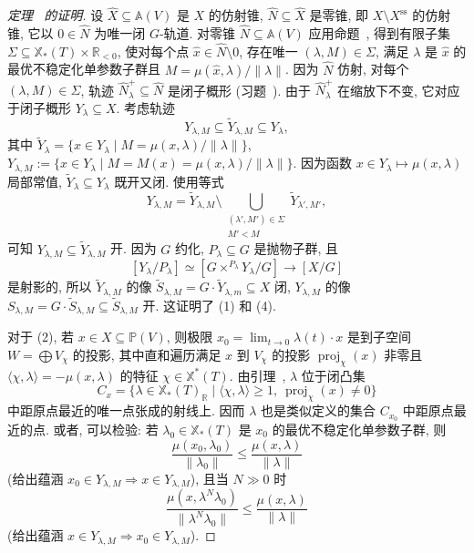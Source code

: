 \begin{proof}[定理~ 的证明]
设 $\widehat X\subseteq\mathbb A(V)$ 是 $X$ 的仿射锥, $\widehat N\subseteq\widehat X$ 是零锥, 即 $X\setminus X^{\mathrm{ss}}$ 的仿射锥, 它以 $0\in\widehat N$ 为唯一闭 $G$-轨道. 对零锥 $\widehat N\subseteq\mathbb A(V)$ 应用命题~, 得到有限子集 $\Sigma\subseteq\mathbb X_*(T)\times\mathbb R_{<0}$, 使对每个点 $\widehat x\in\widehat N\setminus0$, 存在唯一 $(\lambda,M)\in\Sigma$, 满足 $\lambda$ 是 $\widehat x$ 的最优不稳定化单参数子群且 $M=\mu(\widehat x,\lambda)/\|\lambda\|$. 因为 $\widehat N$ 仿射, 对每个 $(\lambda,M)\in\Sigma$, 轨迹 $\widehat N_\lambda^+\subseteq\widehat N$ 是闭子概形 (习题~). 由于 $\widehat N_\lambda^+$ 在缩放下不变, 它对应于闭子概形 $Y_\lambda\subseteq X$. 考虑轨迹
\[
Y_{\lambda,M}\subseteq\widetilde Y_{\lambda,M}\subseteq Y_\lambda,
\]
其中 $\widetilde Y_\lambda=\{x\in Y_\lambda\mid M=\mu(x,\lambda)/\|\lambda\|\}$, $Y_{\lambda,M}:=\{x\in Y_\lambda\mid M=M(x)=\mu(x,\lambda)/\|\lambda\|\}$. 因为函数 $x\in Y_\lambda\mapsto\mu(x,\lambda)$ 局部常值, $\widetilde Y_\lambda\subseteq Y_\lambda$ 既开又闭. 使用等式
\[
Y_{\lambda,M}=\widetilde Y_{\lambda,M}\setminus\bigcup_{\substack{(\lambda',M')\in\Sigma\\M'<M}}\widetilde Y_{\lambda',M'},
\]
可知 $Y_{\lambda,M}\subseteq\widetilde Y_{\lambda,M}$ 开. 因为 $G$ 约化, $P_\lambda\subseteq G$ 是抛物子群, 且
\[
[Y_\lambda/P_\lambda]\simeq[G\times^{P_\lambda}Y_\lambda/G]\longrightarrow[X/G]
\]
是射影的, 所以 $\widetilde Y_{\lambda,M}$ 的像 $\widetilde S_{\lambda,M}=G\cdot\widetilde Y_{\lambda,m}\subseteq X$ 闭, $Y_{\lambda,M}$ 的像 $S_{\lambda,M}=G\cdot\widetilde S_{\lambda,M}\subseteq\widetilde S_{\lambda,M}$ 开. 这证明了 (1) 和 (4).

对于 (2), 若 $x\in X\subseteq\mathbb P(V)$, 则极限 $x_0=\lim_{t\to0}\lambda(t)\cdot x$ 是到子空间 $W=\bigoplus V_\chi$ 的投影, 其中直和遍历满足 $x$ 到 $V_\chi$ 的投影 $\operatorname{proj}_\chi(x)$ 非零且 $\langle\chi,\lambda\rangle=-\mu(x,\lambda)$ 的特征 $\chi\in\mathbb X^*(T)$. 由引理~, $\lambda$ 位于闭凸集
\[
C_x=\{\lambda\in\mathbb X_*(T)_{\mathbb R}\mid\langle\chi,\lambda\rangle\geq1,\ \operatorname{proj}_\chi(x)\ne0\}
\]
中距原点最近的唯一点张成的射线上. 因而 $\lambda$ 也是类似定义的集合 $C_{x_0}$ 中距原点最近的点. 或者, 可以检验: 若 $\lambda_0\in\mathbb X_*(T)$ 是 $x_0$ 的最优不稳定化单参数子群, 则
\[
\frac{\mu(x_0,\lambda_0)}{\|\lambda_0\|}\leq\frac{\mu(x,\lambda)}{\|\lambda\|}
\]
(给出蕴涵 $x_0\in Y_{\lambda,M}\Rightarrow x\in Y_{\lambda,M}$), 且当 $N\gg0$ 时
\[
\frac{\mu(x,\lambda^N\lambda_0)}{\|\lambda^N\lambda_0\|}\leq\frac{\mu(x,\lambda)}{\|\lambda\|}
\]
(给出蕴涵 $x\in Y_{\lambda,M}\Rightarrow x_0\in Y_{\lambda,M}$).


\end{proof}
